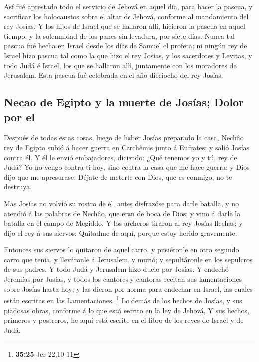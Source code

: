  Así fué aprestado todo el servicio de Jehová en aquel
día, para hacer la pascua, y sacrificar los holocaustos sobre el altar
de Jehová, conforme al mandamiento del rey Josías.  Y los
hijos de Israel que se hallaron allí, hicieron la pascua en aquel
tiempo, y la solemnidad de los panes sin levadura, por siete días.
 Nunca tal pascua fué hecha en Israel desde los días de
Samuel el profeta; ni ningún rey de Israel hizo pascua tal como la que
hizo el rey Josías, y los sacerdotes y Levitas, y todo Judá é Israel,
los que se hallaron allí, juntamente con los moradores de Jerusalem.
 Esta pascua fué celebrada en el año dieciocho del rey
Josías.

\hypertarget{necao-de-egipto-y-la-muerte-de-josuxedas-dolor-por-el}{%
\subsection{Necao de Egipto y la muerte de Josías; Dolor por
el}\label{necao-de-egipto-y-la-muerte-de-josuxedas-dolor-por-el}}

 Después de todas estas cosas, luego de haber Josías
preparado la casa, Nechâo rey de Egipto subió á hacer guerra en
Carchêmis junto á Eufrates; y salió Josías contra él.  Y
él le envió embajadores, diciendo: ¿Qué tenemos yo y tú, rey de Judá? Yo
no vengo contra ti hoy, sino contra la casa que me hace guerra: y Dios
dijo que me apresurase. Déjate de meterte con Dios, que es conmigo, no
te destruya.

 Mas Josías no volvió su rostro de él, antes disfrazóse
para darle batalla, y no atendió á las palabras de Nechâo, que eran de
boca de Dios; y vino á darle la batalla en el campo de Megiddo.
 Y los archeros tiraron al rey Josías flechas; y dijo el
rey á sus siervos: Quitadme de aquí, porque estoy herido gravemente.

 Entonces sus siervos lo quitaron de aquel carro, y
pusiéronle en otro segundo carro que tenía, y lleváronle á Jerusalem, y
murió; y sepultáronle en los sepulcros de sus padres. Y todo Judá y
Jerusalem hizo duelo por Josías.  Y endechó Jeremías por
Josías, y todos los cantores y cantoras recitan sus lamentaciones sobre
Josías hasta hoy; y las dieron por norma para endechar en Israel, las
cuales están escritas en las Lamentaciones. \footnote{\textbf{35:25} Jer
  22,10-11}  Lo demás de los hechos de Josías, y sus
piadosas obras, conforme á lo que está escrito en la ley de Jehová,
 Y sus hechos, primeros y postreros, he aquí está escrito
en el libro de los reyes de Israel y de Judá.

